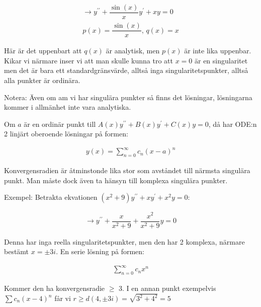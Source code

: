 \begin{equation*}
  \begin{gathered}
    \rightarrow y^{\prime\prime}+\dfrac{\sin(x)}{x}y^{\prime}+xy=0\\
    p(x) = \dfrac{\sin(x)}{x}\text{, } q(x) = x
  \end{gathered}
\end{equation*}
\par\bigskip
\noindent Här är det uppenbart att $q(x)$ är analytisk, men $p(x)$ är inte lika uppenbar. Kikar vi närmare inser vi att man skulle kunna tro att $x=0$ är en singularitet men det är bara ett standardgränsvärde, alltså inga singularitetspunkter, alltså alla punkter är ordinära. 
\par\bigskip
\noindent Notera: Även om am vi har singulära punkter så finns det lösningar, lösningarna kommer i allmänhet inte vara analytiska.
\pagebreak
\begin{theo}
  Om $a$ är en ordinär punkt till $A(x)y^{\prime\prime}+B(x)y^{\prime}+C(x)y=0$, då har ODE:n 2 linjärt oberoende lösningar på formen:

  \begin{equation*}
    \begin{gathered}
      y(x) = \sum_{n=0}^{\infty}c_n(x-a)^n
    \end{gathered}
  \end{equation*}
  \par\bigskip
  \noindent Konvergensradien är åtminstonde lika stor som avståndet till närmsta singulära punkt. Man måste dock även ta hänsyn till komplexa singulära punkter.
\end{theo}
\par\bigskip
\noindent Exempel: Betrakta ekvationen $(x^2+9)y^{\prime\prime}+xy^{\prime}+x^2y=0$:


\begin{equation*}
  \begin{gathered}
    \rightarrow y^{\prime\prime}+\dfrac{x}{x^2+9}+\dfrac{x^2}{x^2+9}y=0
  \end{gathered}
\end{equation*}
\par\bigskip
\noindent Denna har inga reella singularitetspunkter, men den har 2 komplexa, närmare bestämt $x = \pm3i$. En serie lösning på formen:

\begin{equation*}
  \begin{gathered}
    \sum_{n=0}^{\infty}c_nx^n
  \end{gathered}
\end{equation*}
\par\bigskip
\noindent Kommer den ha konvergensradie $\geq$ 3. I en annan punkt exempelvis $\sum c_n(x-4)^n$ får vi $r\geq d(4,\pm3i)= \sqrt{3^2+4^2}=5$




